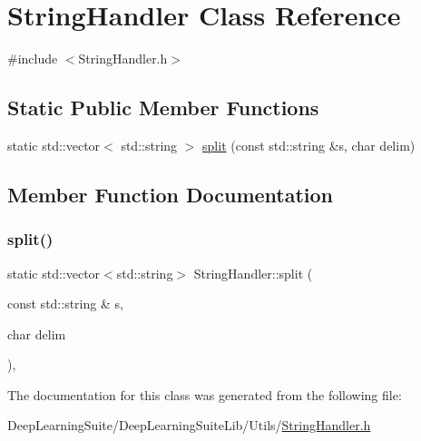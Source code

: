 \hypertarget{class_string_handler}{}\section{String\+Handler Class Reference}
\label{class_string_handler}


{\ttfamily \#include $<$String\+Handler.\+h$>$}

\subsection*{Static Public Member Functions}
\begin{DoxyCompactItemize}
\item 
static std\+::vector$<$ std\+::string $>$ \hyperlink{class_string_handler_a6df77cc748896469647c0abf21cb5e92}{split} (const std\+::string \&s, char delim)
\end{DoxyCompactItemize}


\subsection{Member Function Documentation}
\mbox{\label{class_string_handler_a6df77cc748896469647c0abf21cb5e92}} 
\subsubsection{\texorpdfstring{split()}{split()}}
{\footnotesize\ttfamily static std\+::vector$<$std\+::string$>$ String\+Handler\+::split (\begin{DoxyParamCaption}\item[{const std\+::string \&}]{s,  }\item[{char}]{delim }\end{DoxyParamCaption})\hspace{0.3cm}{\ttfamily [inline]}, {\ttfamily [static]}}



The documentation for this class was generated from the following file\+:\begin{DoxyCompactItemize}
\item 
Deep\+Learning\+Suite/\+Deep\+Learning\+Suite\+Lib/\+Utils/\hyperlink{_string_handler_8h}{String\+Handler.\+h}\end{DoxyCompactItemize}
